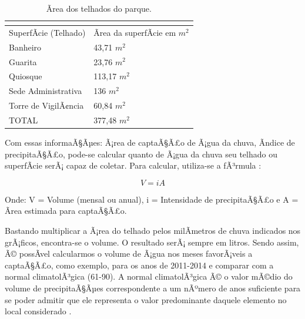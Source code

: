 \begin{table}[h]
\centering
\caption{Ãrea dos telhados do parque.}
\label{Ãrea dos telhados do parque.}
\begin{tabular}{lll}
 & \multicolumn{2}{l}{} \\ \hline
\multicolumn{1}{|l|}{SuperfÃ­cie (Telhado)} & \multicolumn{2}{l|}{Ãrea da superfÃ­cie em $m^{2}$} \\ \hline
\multicolumn{1}{|l|}{Banheiro} & \multicolumn{2}{l|}{43,71 $m^{2}$} \\ \hline
\multicolumn{1}{|l|}{Guarita} & \multicolumn{2}{l|}{23,76 $m^{2}$} \\ \hline
\multicolumn{1}{|l|}{Quiosque} & \multicolumn{2}{l|}{113,17 $m^{2}$} \\ \hline
\multicolumn{1}{|l|}{Sede Administrativa} & \multicolumn{2}{l|}{136 $m^{2}$} \\ \hline
\multicolumn{1}{|l|}{Torre de VigilÃ¢ncia} & \multicolumn{2}{l|}{60,84 $m^{2}$} \\ \hline
\multicolumn{1}{|l|}{TOTAL} & \multicolumn{2}{l|}{377,48 $m^{2}$} \\ \hline
\end{tabular}
\end{table}

Com essas informaÃ§Ãµes: Ã¡rea de captaÃ§Ã£o de Ã¡gua da chuva, Ã­ndice de precipitaÃ§Ã£o, pode-se calcular quanto de Ã¡gua da chuva seu telhado ou superfÃ­cie serÃ¡ capaz de coletar. Para calcular, utiliza-se a fÃ³rmula \cite{SANEPAR}:

\begin{equation}
V = iA 
\end{equation}


Onde: V = Volume (mensal ou anual),  i = Intensidade de precipitaÃ§Ã£o e A = Ãrea estimada para captaÃ§Ã£o. 

Bastando multiplicar a Ã¡rea do telhado pelos milÃ­metros de chuva indicados nos grÃ¡ficos, encontra-se o volume. O resultado serÃ¡ sempre em litros. Sendo assim, Ã© possÃ­vel calcularmos o volume de Ã¡gua nos meses favorÃ¡veis a captaÃ§Ã£o, como exemplo, para os anos de 2011-2014 e comparar com a normal climatolÃ³gica (61-90). A normal climatolÃ³gica Ã© o valor mÃ©dio do volume de precipitaÃ§Ãµes correspondente a um nÃºmero de anos suficiente para se poder admitir que ele representa o valor predominante daquele elemento no local considerado \cite{IPMA}.


